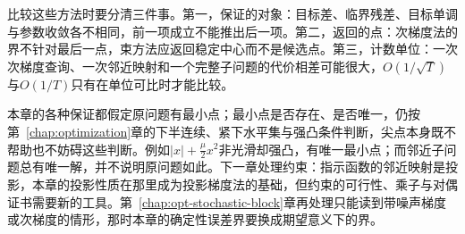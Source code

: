 比较这些方法时要分清三件事。第一，保证的对象：目标差、临界残差、目标单调与参数收敛各不相同，前一项成立不能推出后一项。第二，返回的点：次梯度法的界不针对最后一点，束方法应返回稳定中心而不是候选点。第三，计数单位：一次次梯度查询、一次邻近映射和一个完整子问题的代价相差可能很大，$O(1/\sqrt T)$与$O(1/T)$只有在单位可比时才能比较。

本章的各种保证都假定原问题有最小点；最小点是否存在、是否唯一，仍按第~\ref{chap:optimization}章的下半连续、紧下水平集与强凸条件判断，尖点本身既不帮助也不妨碍这些判断。例如$|x|+\frac\mu2x^2$非光滑却强凸，有唯一最小点；而邻近子问题总有唯一解，并不说明原问题如此。下一章处理约束：指示函数的邻近映射是投影，本章的投影性质在那里成为投影梯度法的基础，但约束的可行性、乘子与对偶证书需要新的工具。第~\ref{chap:opt-stochastic-block}章再处理只能读到带噪声梯度或次梯度的情形，那时本章的确定性误差界要换成期望意义下的界。
